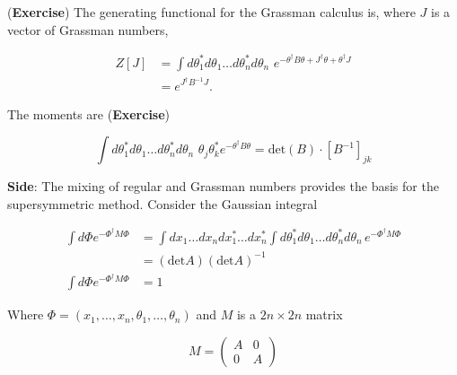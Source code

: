 \noindent (\textbf{Exercise}) The generating functional for the Grassman calculus is, where $J$ is a vector of Grassman numbers,

\begin{align}
Z [J] &= \int d\theta_1^* d\theta_1 \dots d\theta_n^* d\theta_n \,\, e^{-\theta^\dagger B \theta + J^\dagger \theta + \theta^\dagger J} \\
&= e^{J^\dagger B^{-1} J}.
\end{align}

\noindent The moments are (\textbf{Exercise})

\begin{equation}
\int d\theta_1^* d\theta_1 \dots d\theta_n^* d\theta_n \,\, \theta_j \theta_k^* e^{-\theta^\dagger B \theta} = \text{det} (B) \cdot [B^{-1}]_{jk}
\end{equation}

\noindent \textbf{Side}: The mixing of regular and Grassman numbers provides the basis for the supersymmetric method. Consider the Gaussian integral

\begin{align}
\int d \Phi e^{-\Phi^\dagger M \Phi} &= \int dx_1 \dots dx_n dx_1^* \dots dx_n^* \int d\theta_1^* d \theta_1 \dots d \theta_n^* d \theta_n \, e^{-\Phi^\dagger M \Phi} \\
&= (\text{det} A)(\text{det} A)^{-1} \\
\int d \Phi e^{-\Phi^\dagger M \Phi} &= 1
\end{align}

\noindent Where $\Phi = (x_1, \dots, x_n, \theta_1, \dots, \theta_n)$ and $M$ is a $2n \times 2n$ matrix

\begin{equation}
M= \left( \begin{matrix} A & 0 \\ 0 & A \end{matrix}  \right)
\end{equation}